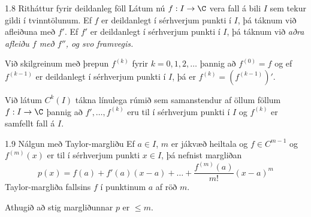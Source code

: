 %
\begin{frame}{1.8 Ritháttur fyrir deildanleg föll}
Látum nú $f : I \to \C$ vera fall á bili $I$ sem tekur gildi í
tvinntölunum. Ef $f$ er deildanlegt í sérhverjum punkti í $I$, þá
táknum við afleiðuna með $f'$. Ef $f'$ er deildanlegt í sérhverjum
punkti í $I$, þá táknum við \em aðra afleiðu \em $f$ með $f''$, og svo
framvegis. 

\pause
\smallskip
Við skilgreinum með þrepun $f^{(k)}$ fyrir $k = 0,1,2,
\ldots$ þannig að $f^{(0)} = f$ og ef $f^{(k-1)}$ er deildanlegt í
sérhverjum punkti í $I$, þá er $f^{(k)} = (f^{(k-1)})'$. 

\pause
\smallskip
Við látum
$C^{k}(I)$ tákna línulega rúmið sem samanstendur af öllum föllum $f :
I \to \C$ þannig að $f', \ldots, f^{(k)}$ eru til í sérhverjum punkti
í $I$ og $f^{(k)}$ er samfellt fall á $I$. 
\end{frame}
%
\begin{frame}{1.9 Nálgun með Taylor-margliðu} 
Ef $a \in I$, $m$ er jákvæð heiltala og $f \in C^{m-1}$ og
$f^{(m)}(x)$ er til í sérhverjum punkti $x \in I$, þá nefnist 
margliðan 
\begin{equation*}
  p(x) = %
f(a) + f'(a)(x-a) + \ldots   + \frac{f^{(m)}(a)}{m!}(x-a)^m
\end{equation*}
Taylor-margliða fallsins $f$ í punktinum $a$ af röð $m$. 

\pause
Athugið að stig margliðunnar $p$ er $\leq m$. 

\end{frame}

